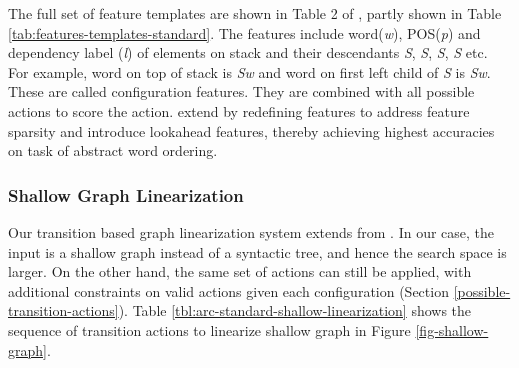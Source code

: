 \documentclass[11pt]{article}
\begin{document}
The full set of feature templates are shown in Table 2 of , partly shown in Table \ref{tab:features-templates-standard}. The features include word({\it w}), POS({\it p}) and dependency label ({\it l}) of elements on stack and their descendants {\it S}, {\it S}, {\it S}, {\it S} etc. For example, word on top of stack is {\it S}{\it w} and word on first left child of {\it S} is {\it S}{\it w}. These are called configuration features. They are combined with all possible actions to score the action.
 extend  by redefining features to address feature sparsity and introduce lookahead features, thereby achieving highest accuracies on task of abstract word ordering. 

\subsubsection{Shallow Graph Linearization}
Our transition based graph linearization system extends from . In our case, the input is a shallow graph instead of a syntactic tree, and hence the search space is larger. On the other hand, the same set of actions can still be applied, with additional constraints on valid actions given each configuration (Section \ref{possible-transition-actions}). Table \ref{tbl:arc-standard-shallow-linearization} shows the sequence of transition actions to linearize shallow graph in Figure \ref{fig-shallow-graph}. 
\end{document}
